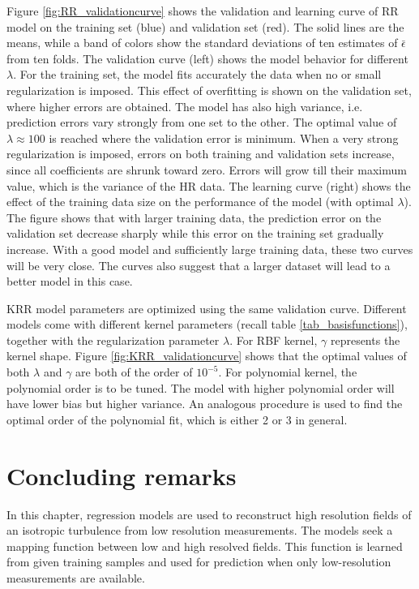Figure \ref{fig:RR_validationcurve} shows the validation and learning curve of RR model on the training set (blue) and validation set (red). The solid lines are the means, while a band of colors show the standard deviations of ten estimates of $ \bar{\epsilon} $ from ten folds. The validation curve (left) shows the model behavior for different $ \lambda $. For the training set, the model fits accurately the data when no or small regularization is imposed. This effect of overfitting is shown on the validation set, where higher errors are obtained. The model has also high variance, i.e. prediction errors vary strongly from one set to the other. The optimal value of $ \lambda \approx 100 $ is reached where the validation error is minimum. When a very strong regularization is imposed, errors on both training and validation sets increase, since all coefficients are shrunk toward zero. Errors will grow till their maximum value, which is the variance of the HR data. The learning curve (right) shows the effect of the training data size on the performance of the model (with optimal $ \lambda $). The figure shows that with larger training data, the prediction error on the validation set decrease sharply while this error on the training set gradually increase. With a good model and sufficiently large training data, these two curves will be very close. The curves also suggest that a larger dataset will lead to a better model in this case. 

KRR model parameters are optimized using the same validation curve. Different models come with different kernel parameters (recall table \ref{tab_basisfunctions}), together with the regularization parameter $ \lambda $. For RBF kernel, $ \gamma $ represents the kernel shape. Figure \ref{fig:KRR_validationcurve} shows that the optimal values of both $ \lambda $ and $ \gamma $ are both of the order of $ 10^{-5} $. For polynomial kernel, the polynomial order is to be tuned. The model with higher polynomial order will have lower bias but higher variance. An analogous procedure is used to find the optimal order of the polynomial fit, which is either 2 or 3 in general. 

\section{Concluding remarks}
In this chapter, regression models are used to reconstruct high resolution fields of an isotropic turbulence from low resolution measurements. The models seek a mapping function between low and high resolved fields. This function is learned from given training samples and used for prediction when only low-resolution measurements are available. 


